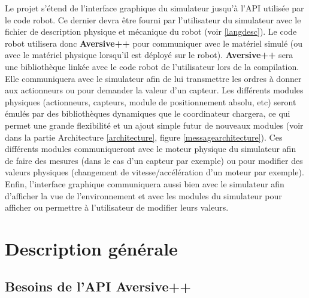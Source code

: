 \documentclass{scrreprt}
\begin{document}

Le projet s'étend de l'interface graphique du simulateur jusqu'à l'API utilisée par le code robot. Ce dernier devra être fourni par l'utilisateur du simulateur avec le fichier de description physique et mécanique du robot (voir \ref{langdesc}).
Le code robot utilisera donc \textbf{Aversive++} pour communiquer avec le matériel simulé (ou avec le matériel physique lorsqu'il est déployé sur le robot). \textbf{Aversive++} sera une bibliothèque linkée avec le code robot de l'utilisateur lors de la compilation. Elle communiquera avec le simulateur afin de lui transmettre les ordres à donner aux actionneurs ou pour demander la valeur d'un capteur. Les différents modules physiques (actionneurs, capteurs, module de positionnement absolu, etc) seront émulés par des bibliothèques dynamiques que le coordinateur chargera, ce qui permet une grande flexibilité et un ajout simple futur de nouveaux modules (voir dans la partie Architecture \ref{architecture}, figure \ref{messagearchitecture}). Ces différents modules communiqueront avec le moteur physique du simulateur afin de faire des mesures (dans le cas d'un capteur par exemple)  ou pour modifier des valeurs physiques (changement de vitesse/accélération d'un moteur par exemple). Enfin, l'interface graphique communiquera aussi bien avec le simulateur afin d'afficher la vue de l'environnement et avec les modules du simulateur pour afficher ou permettre à l'utilisateur de modifier leurs valeurs.





      \chapter{Description générale}        %

\section{Besoins de l'API Aversive++}

\newpage
\end{document}
